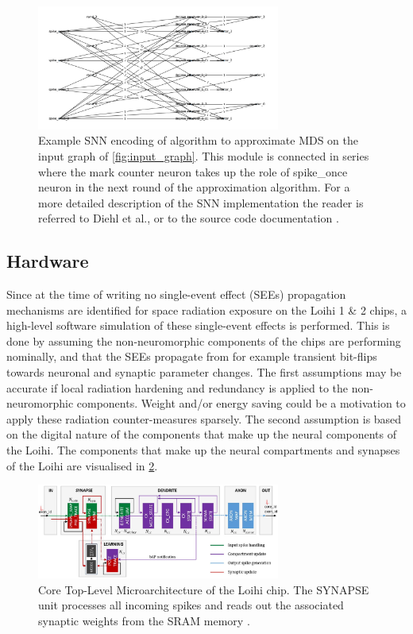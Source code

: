 \begin{figure}[H]
    \centering
    \includegraphics[width=8cm]{latex/Images/structured_graph.png}
    \caption{Example SNN encoding of algorithm to approximate MDS on the input graph of \cref{fig:input_graph}. This module is connected in series where the mark counter neuron takes up the role of spike\_once neuron in the next round of the approximation algorithm. For a more detailed description of the SNN implementation the reader is referred to Diehl et al., or to the source code documentation \cite{}. %
    }
    \label{fig:encoded_snn}
\end{figure}

\subsection{Hardware}\label{subsec:hardware}
Since at the time of writing no single-event effect (SEEs) propagation mechanisms are identified for space radiation exposure on the Loihi 1 \& 2 chips, a high-level software simulation of these single-event effects is performed. This is done by assuming the non-neuromorphic components of the chips are performing nominally, and that the SEEs propagate from for example transient bit-flips towards neuronal and synaptic parameter changes. The first assumptions may be accurate if local radiation hardening and redundancy is applied to the non-neuromorphic components. Weight and/or energy saving could be a motivation to apply these radiation counter-measures sparsely. The second assumption is based on the digital nature of the components that make up the neural components of the Loihi. The components that make up the neural compartments and synapses of the Loihi are visualised in \cref{fig:loihi_micro_architecture}.
\begin{figure}[H]
    \centering
    \includegraphics[width=8cm]{latex/Images/loihi_micro_architecture.png}
    \caption{Core Top-Level Microarchitecture of the Loihi chip. The SYNAPSE unit processes all incoming spikes and
    reads out the associated synaptic weights from the SRAM memory \cite{}%
    .}
    \label{fig:loihi_micro_architecture}
\end{figure}



